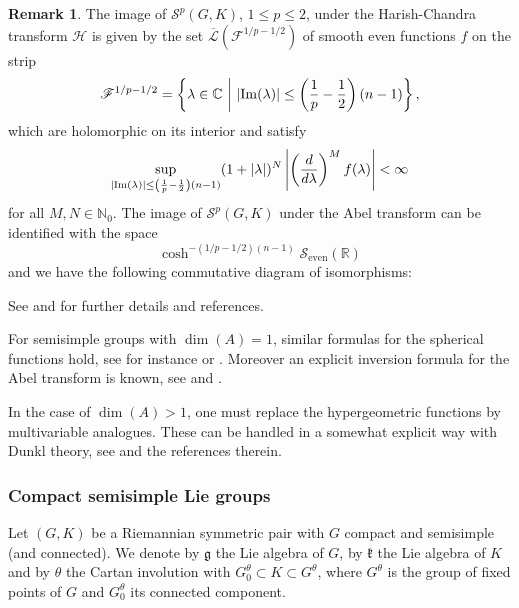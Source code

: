 \documentclass[12pt,reqno,a4paper]{amsart}
\theoremstyle{theorem}
\theoremstyle{definition}
\newtheorem{remark}[theorem]{Remark}
\numberwithin{theorem}{section}
\numberwithin{equation}{section}
\newcommand{\R}{\mathbb{R}}
\newcommand{\N}{\mathbb{N}}
\newcommand{\C}{\mathbb{C}}
\DeclarePairedDelimiter{\abs}{\lvert}{\rvert}
\begin{document}
\begin{remark}
	The image of $\mathscr{S}^p(G,K)$, $1\leq p \leq 2$, under the Harish-Chandra transform $\mathcal{H}$ is given by the set $\overline{\mathscr{L}}(\mathscr{F}^{1/p-1/2})$ of smooth even functions $f$ on the strip
	\[\mathscr{F}^{1/p-1/2}=\left\{\lambda\in \C\ \middle|\ \abs{\mathrm{Im}(\lambda)}\leq \left(\frac{1}{p}-\frac{1}{2}\right)(n-1)\right\},\]
	which are holomorphic on its interior and satisfy
	\[\sup_{\abs{\mathrm{Im}(\lambda)}\leq \left(\frac{1}{p}-\frac{1}{2}\right)(n-1)}(1+\abs{\lambda})^N\left\lvert\left(\frac{d}{d\lambda}\right)^Mf(\lambda)\right \rvert<\infty\]
	for all $M,N\in \N_0$. The image of $\mathscr{S}^p(G,K)$ under the Abel transform can be identified with the space
	\[\cosh^{-(1/p-1/2)(n-1)}\mathscr{S}_{\mathrm{even}}(\R)\]
	and we have the following commutative diagram of isomorphisms:
	\begin{center}
	\end{center}
	See \cite{Koornwinder} and \cite{AnkerHarmonicANGroups} for further details and references.
	
	For semisimple groups with $\dim(A) = 1$, similar formulas for the spherical functions hold, see for instance \cite{Koornwinder} or \cite{Wolf}. Moreover an explicit inversion formula for the Abel transform is known, see \cite{Koornwinder} and \cite{AnkerDunklTheory}.
	
	In the case of $\dim(A)>1$, one must replace the hypergeometric functions by multivariable analogues. These can be handled in a somewhat explicit way with Dunkl theory, see \cite{AnkerDunklTheory} and the references therein. 
\end{remark}
\subsubsection{Compact semisimple Lie groups}
Let $(G, K)$ be a Riemannian symmetric pair with $G$ compact and semisimple (and connected). We denote by $\mathfrak{g}$ the Lie algebra of $G$, by $\mathfrak{k}$ the Lie algebra of $K$ and by $\theta$ the Cartan involution with $G^\theta_0\subset K\subset G^\theta$, where $G^\theta$ is the group of fixed points of $G$ and $G^\theta_0$ its connected component. 
\end{document}
